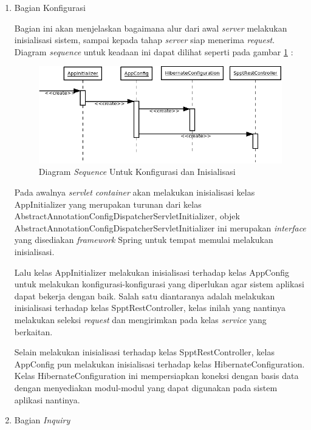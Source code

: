 \begin{enumerate}
  \item Bagian Konfigurasi
  
  Bagian ini akan menjelaskan bagaimana alur dari awal \textit{server} melakukan inisialisasi sistem, sampai kepada tahap \textit{server} siap menerima \textit{request}. Diagram \textit{sequence} untuk keadaan ini dapat dilihat seperti pada gambar \ref{fig:uml-seq-konf} :
  
  \begin{figure}[H]
    \centering
    \includegraphics[width=1\textwidth]{./resources/uml/uml-seq-konf}
    \caption{Diagram \textit{Sequence} Untuk Konfigurasi dan Inisialisasi}
    \label{fig:uml-seq-konf}
  \end{figure}
  
  Pada awalnya \textit{servlet container} akan melakukan inisialisasi kelas AppInitializer yang merupakan turunan dari kelas AbstractAnnotationConfigDispatcherServletInitializer, objek AbstractAnnotationConfigDispatcherServletInitializer ini merupakan \textit{interface} yang disediakan \textit{framework} Spring untuk tempat memulai melakukan inisialisasi.
  
  Lalu kelas AppInitializer melakukan inisialisasi terhadap kelas AppConfig untuk melakukan konfigurasi-konfigurasi yang diperlukan agar sistem aplikasi dapat bekerja dengan baik. Salah satu diantaranya adalah melakukan inisialisasi terhadap kelas SpptRestController, kelas inilah yang nantinya melakukan seleksi \textit{request} dan mengirimkan pada kelas \textit{service} yang berkaitan.
  
  Selain melakukan inisialisasi terhadap kelas SpptRestController, kelas AppConfig pun melakukan inisialisasi terhadap kelas HibernateConfiguration. Kelas HibernateConfiguration ini mempersiapkan koneksi dengan basis data dengan menyediakan modul-modul yang dapat digunakan pada sistem aplikasi nantinya.
  
  \item Bagian \textit{Inquiry}
  

\end{enumerate}
